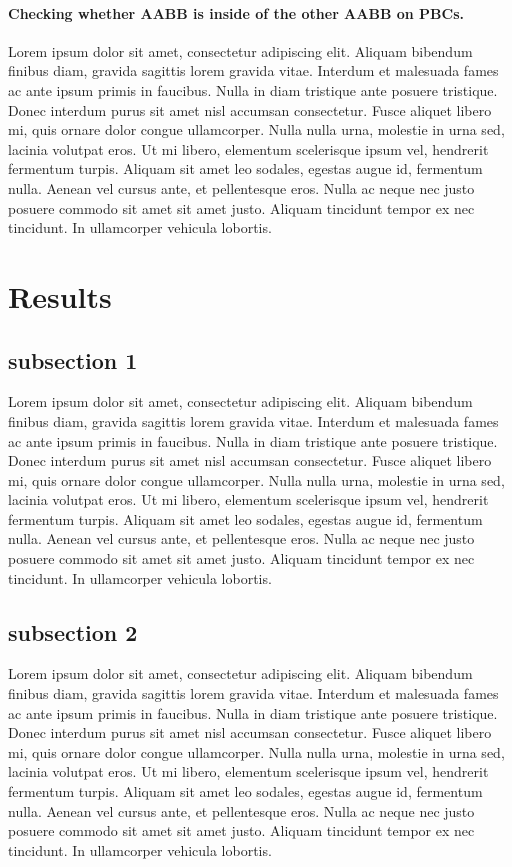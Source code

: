 \documentclass[10pt,letterpaper,twocolumn]{article}
\begin{document}
\paragraph{Checking whether AABB is inside of the other AABB on PBCs.}
Lorem ipsum dolor sit amet, consectetur adipiscing elit. Aliquam bibendum
finibus diam, gravida sagittis lorem gravida vitae. Interdum et malesuada fames
ac ante ipsum primis in faucibus. Nulla in diam tristique ante posuere
tristique. Donec interdum purus sit amet nisl accumsan consectetur. Fusce
aliquet libero mi, quis ornare dolor congue ullamcorper. Nulla nulla urna,
molestie in urna sed, lacinia volutpat eros. Ut mi libero, elementum scelerisque
ipsum vel, hendrerit fermentum turpis. Aliquam sit amet leo sodales, egestas
augue id, fermentum nulla. Aenean vel cursus ante, et pellentesque eros. Nulla
ac neque nec justo posuere commodo sit amet sit amet justo. Aliquam tincidunt
tempor ex nec tincidunt. In ullamcorper vehicula lobortis.

\section*{Results}
\subsection*{subsection 1}
Lorem ipsum dolor sit amet, consectetur adipiscing elit. Aliquam bibendum
finibus diam, gravida sagittis lorem gravida vitae. Interdum et malesuada fames
ac ante ipsum primis in faucibus. Nulla in diam tristique ante posuere
tristique. Donec interdum purus sit amet nisl accumsan consectetur. Fusce
aliquet libero mi, quis ornare dolor congue ullamcorper. Nulla nulla urna,
molestie in urna sed, lacinia volutpat eros. Ut mi libero, elementum scelerisque
ipsum vel, hendrerit fermentum turpis. Aliquam sit amet leo sodales, egestas
augue id, fermentum nulla. Aenean vel cursus ante, et pellentesque eros. Nulla
ac neque nec justo posuere commodo sit amet sit amet justo. Aliquam tincidunt
tempor ex nec tincidunt. In ullamcorper vehicula lobortis.

\subsection*{subsection 2}
Lorem ipsum dolor sit amet, consectetur adipiscing elit. Aliquam bibendum
finibus diam, gravida sagittis lorem gravida vitae. Interdum et malesuada fames
ac ante ipsum primis in faucibus. Nulla in diam tristique ante posuere
tristique. Donec interdum purus sit amet nisl accumsan consectetur. Fusce
aliquet libero mi, quis ornare dolor congue ullamcorper. Nulla nulla urna,
molestie in urna sed, lacinia volutpat eros. Ut mi libero, elementum scelerisque
ipsum vel, hendrerit fermentum turpis. Aliquam sit amet leo sodales, egestas
augue id, fermentum nulla. Aenean vel cursus ante, et pellentesque eros. Nulla
ac neque nec justo posuere commodo sit amet sit amet justo. Aliquam tincidunt
tempor ex nec tincidunt. In ullamcorper vehicula lobortis.
\end{document}
